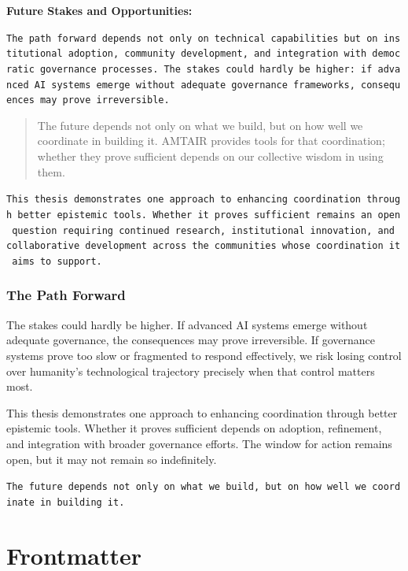 \documentclass[
  11pt,
  letterpaper,
]{book}
\begin{document}
\textbf{Future Stakes and Opportunities:}

\texttt{The\ path\ forward\ depends\ not\ only\ on\ technical\ capabilities\ but\ on\ institutional\ adoption,\ community\ development,\ and\ integration\ with\ democratic\ governance\ processes.\ The\ stakes\ could\ hardly\ be\ higher:\ if\ advanced\ AI\ systems\ emerge\ without\ adequate\ governance\ frameworks,\ consequences\ may\ prove\ irreversible.}

\begin{quote}
The future depends not only on what we build, but on how well we
coordinate in building it. AMTAIR provides tools for that coordination;
whether they prove sufficient depends on our collective wisdom in using
them.
\end{quote}

\texttt{This\ thesis\ demonstrates\ one\ approach\ to\ enhancing\ coordination\ through\ better\ epistemic\ tools.\ Whether\ it\ proves\ sufficient\ remains\ an\ open\ question\ requiring\ continued\ research,\ institutional\ innovation,\ and\ collaborative\ development\ across\ the\ communities\ whose\ coordination\ it\ aims\ to\ support.}

\subsection{The Path Forward}\label{sec-path-forward}

The stakes could hardly be higher. If advanced AI systems emerge without
adequate governance, the consequences may prove irreversible. If
governance systems prove too slow or fragmented to respond effectively,
we risk losing control over humanity's technological trajectory
precisely when that control matters most.

This thesis demonstrates one approach to enhancing coordination through
better epistemic tools. Whether it proves sufficient depends on
adoption, refinement, and integration with broader governance efforts.
The window for action remains open, but it may not remain so
indefinitely.

\texttt{The\ future\ depends\ not\ only\ on\ what\ we\ build,\ but\ on\ how\ well\ we\ coordinate\ in\ building\ it.}


\chapter*{Frontmatter}\label{frontmatter}
\end{document}
